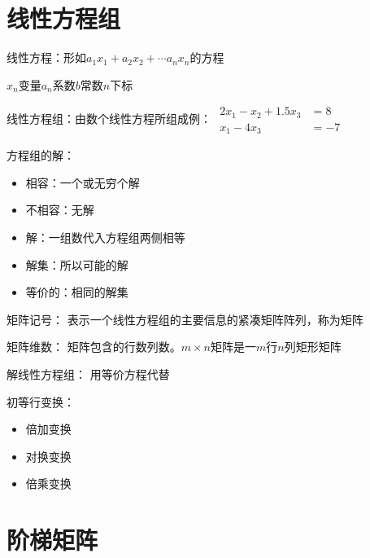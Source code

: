 \documentclass[UTF8]{ctexart}
\begin{document}
	\section{线性方程组}
	线性方程：形如$a_1x_1+a_2x_2+\cdots a_nx_n$的方程
	
	$x_n$变量$a_n$系数$b$常数$n$下标
	
	线性方程组：由数个线性方程所组成例：
	$\begin{array}{ll}
		2x_1 - x_2 + 1.5x_3 &= 8\\
		 x_1 -         4x_3 &= -7
	\end{array}$
	
	方程组的解：
	\begin{itemize}
		\item 相容：一个或无穷个解
		\item 不相容：无解
	\end{itemize}
	\begin{itemize}
	\item 解：一组数代入方程组两侧相等
	\item 解集：所以可能的解
	\item 等价的：相同的解集
	\end{itemize}

	矩阵记号：
	表示一个线性方程组的主要信息的紧凑矩阵阵列，称为矩阵
	
	矩阵维数：
	矩阵包含的行数列数。$m\times n$矩阵是一$m$行$n$列矩形矩阵
	
	解线性方程组：
	用等价方程代替
	
	初等行变换：
	\begin{itemize}
		\item 倍加变换
		\item 对换变换
		\item 倍乘变换
	\end{itemize}
	

	\section{阶梯矩阵}
	
\end{document}
